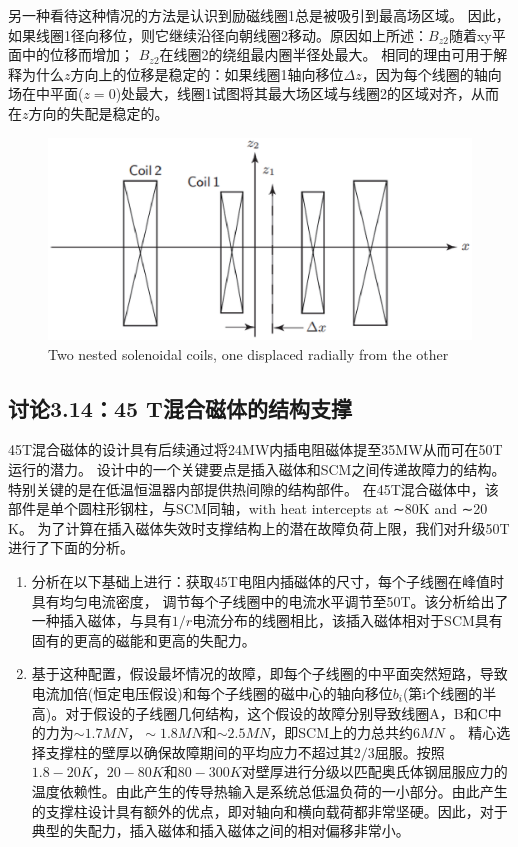 另一种看待这种情况的方法是认识到励磁线圈1总是被吸引到最高场区域。
因此，如果线圈1径向移位，则它继续沿径向朝线圈2移动。原因如上所述：$B_{z2}$随着xy平面中的位移而增加； $B_{z2}$在线圈2的绕组最内圈半径处最大。
相同的理由可用于解释为什么$z$方向上的位移是稳定的：如果线圈1轴向移位$\Delta z$，因为每个线圈的轴向场在中平面($z = 0$)处最大，线圈1试图将其最大场区域与线圈2的区域对齐，从而在$z$方向的失配是稳定的。
\begin{figure}[htbp]
	\centering
	\includegraphics[scale=0.5]{chpt3/figs/fig3.47.eps}
	\caption{Two nested solenoidal coils, one displaced radially from the other}
\end{figure}
\newpage



\subsection{讨论3.14：45 T混合磁体的结构支撑}
45T混合磁体的设计具有后续通过将24MW内插电阻磁体提至35MW从而可在50T运行的潜力。
设计中的一个关键要点是插入磁体和SCM之间传递故障力的结构。
特别关键的是在低温恒温器内部提供热间隙的结构部件。
在45T混合磁体中，该部件是单个圆柱形钢柱，与SCM同轴，with heat intercepts at ∼80K and ∼20 K。
为了计算在插入磁体失效时支撑结构上的潜在故障负荷上限，我们对升级50T进行了下面的分析。
\begin{enumerate}
	\item 分析在以下基础上进行：获取45T电阻内插磁体的尺寸，每个子线圈在峰值时具有均匀电流密度，
	调节每个子线圈中的电流水平调节至50T。该分析给出了一种插入磁体，与具有$1 / r$电流分布的线圈相比，该插入磁体相对于SCM具有固有的更高的磁能和更高的失配力。
	
	\item 基于这种配置，假设最坏情况的故障，即每个子线圈的中平面突然短路，导致电流加倍(恒定电压假设)和每个子线圈的磁中心的轴向移位$b_i$(第i个线圈的半高)。对于假设的子线圈几何结构，这个假设的故障分别导致线圈A，B和C中的力为$\sim 1.7 MN，\sim 1.8 MN$和$\sim 2.5 MN$，即SCM上的力总共约$6 MN$ 。
	精心选择支撑柱的壁厚以确保故障期间的平均应力不超过其$2/3$屈服。按照$1.8-20 K，20-80 K$和$80-300 K$对壁厚进行分级以匹配奥氏体钢屈服应力的温度依赖性。由此产生的传导热输入是系统总低温负荷的一小部分。由此产生的支撑柱设计具有额外的优点，即对轴向和横向载荷都非常坚硬。因此，对于典型的失配力，插入磁体和插入磁体之间的相对偏移非常小。
\end{enumerate}
\newpage



